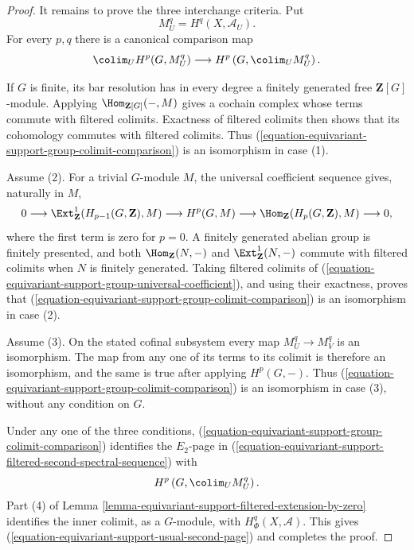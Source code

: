 \begin{proof}
It remains to prove the three interchange criteria. Put
$$
M_U^q=H^q(X,\mathcal A_U).
$$
For every $p,q$ there is a canonical comparison map
\begin{equation}
\label{equation-equivariant-support-group-colimit-comparison}
\colim_UH^p(G,M_U^q)
\longrightarrow
H^p\left(G,\colim_UM_U^q\right).
\end{equation}

If $G$ is finite, its bar resolution has in every degree a finitely
generated free $\mathbf Z[G]$-module. Applying
$\Hom_{\mathbf Z[G]}(-,M)$ gives a cochain complex whose terms commute with
filtered colimits. Exactness of filtered colimits then shows that its
cohomology commutes with filtered colimits. Thus
(\ref{equation-equivariant-support-group-colimit-comparison}) is an
isomorphism in case (1).

Assume (2). For a trivial $G$-module $M$, the universal coefficient
sequence gives, naturally in $M$,
\begin{equation}
\label{equation-equivariant-support-group-universal-coefficient}
0\longrightarrow
\Ext^1_{\mathbf Z}(H_{p-1}(G,\mathbf Z),M)
\longrightarrow H^p(G,M)
\longrightarrow
\Hom_{\mathbf Z}(H_p(G,\mathbf Z),M)
\longrightarrow0,
\end{equation}
where the first term is zero for $p=0$. A finitely generated abelian group
is finitely presented, and both $\Hom_{\mathbf Z}(N,-)$ and
$\Ext^1_{\mathbf Z}(N,-)$ commute with filtered colimits when $N$ is
finitely generated. Taking filtered colimits of
(\ref{equation-equivariant-support-group-universal-coefficient}), and using
their exactness, proves that
(\ref{equation-equivariant-support-group-colimit-comparison}) is an
isomorphism in case (2).

Assume (3). On the stated cofinal subsystem every map $M_U^q\to M_V^q$
is an isomorphism. The map from any one of its terms to its colimit is
therefore an isomorphism, and the same is true after applying
$H^p(G,-)$. Thus
(\ref{equation-equivariant-support-group-colimit-comparison}) is an
isomorphism in case (3), without any condition on $G$.

Under any one of the three conditions,
(\ref{equation-equivariant-support-group-colimit-comparison}) identifies
the $E_2$-page in
(\ref{equation-equivariant-support-filtered-second-spectral-sequence}) with
$$
H^p\left(G,\colim_UM_U^q\right).
$$
Part (4) of Lemma
\ref{lemma-equivariant-support-filtered-extension-by-zero} identifies the
inner colimit, as a $G$-module, with $H^q_\Phi(X,\mathcal A)$. This gives
(\ref{equation-equivariant-support-usual-second-page}) and completes the
proof.
\end{proof}

